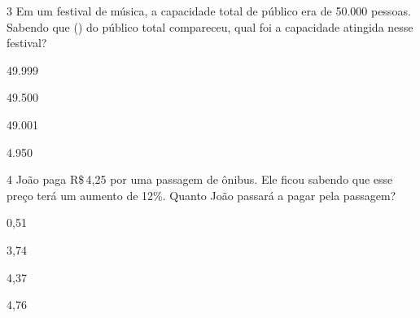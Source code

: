 




\num{3} Em um festival de música, a capacidade total de público era de 50.000
pessoas. Sabendo que () do público total compareceu,
qual foi a capacidade atingida nesse festival?
\item 49.999
\item 49.500
\item 49.001
\item 4.950







\num{4} João paga R\$\,4,25 por uma passagem de ônibus. Ele ficou sabendo que
esse preço terá um aumento de 12\%. Quanto João passará a pagar pela
passagem?
\item 0,51
\item 3,74
\item 4,37
\item 4,76



